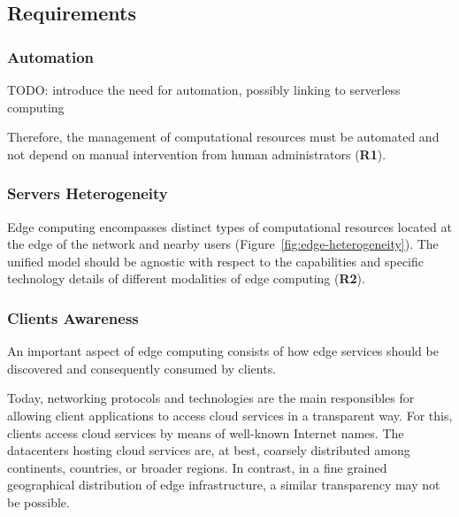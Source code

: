 \subsection{Requirements}

\subsubsection{Automation}

TODO: introduce the need for automation, possibly linking to serverless computing

Therefore, the management of computational resources must be automated and not depend on  manual intervention from human administrators (\textbf{R1}).


\subsubsection{Servers Heterogeneity}

Edge computing encompasses distinct types of computational resources located at the edge of the network and nearby users (Figure~\ref{fig:edge-heterogeneity}). The unified model should be agnostic with respect to the capabilities and specific technology details of different modalities of edge computing (\textbf{R2}). 


\subsubsection{Clients Awareness}

An important aspect of edge computing consists of how edge services should be discovered and consequently consumed by clients. 

Today, networking protocols and technologies are the main responsibles for allowing client applications to access cloud services in a transparent way. For this, clients access cloud services by means of well-known Internet names. The datacenters hosting cloud services are, at best, coarsely distributed among continents, countries, or broader regions. 
In contrast, in a fine grained geographical distribution of edge infrastructure, a similar transparency may not be possible. 

